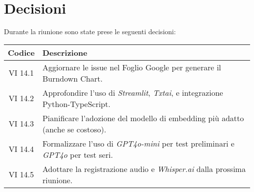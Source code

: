 
\section{Decisioni}

Durante la riunione sono state prese le seguenti decisioni:

\vspace{0.5cm}

\begin{table}[htbp]
    \centering
    \begin{tabular}{|c|p{}|}
        \hline
        \rowcolor[gray]{0.75}
        \textbf{Codice} & \textbf{Descrizione} \\
        \hline
        VI 14.1 & Aggiornare le issue nel Foglio Google per generare il Burndown Chart. \\
        \hline
        VI 14.2 & Approfondire l'uso di \emph{Streamlit}, \emph{Txtai}, e integrazione Python-TypeScript. \\
        \hline
        VI 14.3 & Pianificare l'adozione del modello di embedding più adatto (anche se costoso). \\
        \hline
        VI 14.4 & Formalizzare l'uso di \emph{GPT4o-mini} per test preliminari e \emph{GPT4o} per test seri. \\
        \hline
        VI 14.5 & Adottare la registrazione audio e \emph{Whisper.ai} dalla prossima riunione. \\
        \hline
    \end{tabular}
\end{table}
